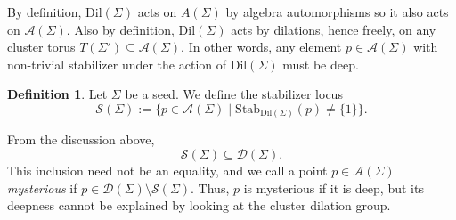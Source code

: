 \documentclass{amsart}
\newcommand{\seed}{\Sigma}
\newcommand{\mut}{\mathrm{mut}}
\newcommand{\var}{\mathcal{A}}
\newcommand{\deep}{\mathcal{D}}
\newcommand{\stab}{\mathcal{S}}
\newcommand{\Stab}{\mathrm{Stab}}
\numberwithin{equation}{section}
\newtheorem{lemma}[theorem]{Lemma}
\theoremstyle{definition}
\newtheorem{definition}[theorem]{Definition}
\newcommand{\dil}{\mathrm{Dil}}
\begin{document}
By definition, $\dil(\seed)$ acts on $A(\seed)$  by algebra automorphisms so it also acts on $\var(\seed)$. Also by definition, $\dil(\seed)$ acts by dilations, hence freely, on any cluster torus $T(\seed') \subseteq \var(\seed)$. In other words, any element $p \in \var(\seed)$ with non-trivial stabilizer under the action of $\dil(\seed)$ must be deep. 

\begin{definition}
    Let $\seed$ be a seed. We define the stabilizer locus
    \[
    \stab(\seed) := \{p \in \var(\seed) \mid \Stab_{\dil(\Sigma)}(p) \neq \{1\}\}. 
    \]
\end{definition}

    From the discussion above,
    \[
    \stab(\seed) \subseteq \deep(\seed).
    \]
This inclusion need not be an equality, and we call a point $p \in \var(\seed)$ \emph{mysterious} if $p \in \deep(\seed) \setminus \stab(\seed)$. Thus, $p$ is mysterious if it is deep, but its deepness cannot be explained by looking at the cluster dilation group. 


\end{document}
